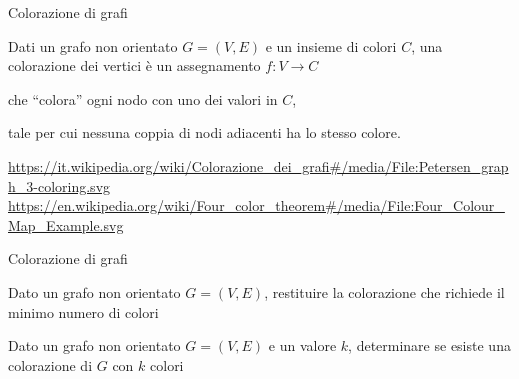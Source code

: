 \begin{frame}{Colorazione di grafi}

\vspace{-9pt}
\begin{myboxtitle}
Dati un grafo non orientato $G=(V,E)$ e un insieme di colori $C$, una \alert{colorazione} dei vertici è un assegnamento  $f: V \rightarrow C$
\BI
\item che ``colora'' ogni nodo con uno dei valori in $C$, 
\item tale per cui nessuna coppia di nodi adiacenti ha lo stesso colore.
\EI
\end{myboxtitle}

\vspace{-12pt}
\tiny
\url{https://it.wikipedia.org/wiki/Colorazione_dei_grafi\#/media/File:Petersen_graph_3-coloring.svg}
\url{https://en.wikipedia.org/wiki/Four_color_theorem\#/media/File:Four_Colour_Map_Example.svg}
\end{frame}

\begin{frame}{Colorazione di grafi}

\vspace{-9pt}
\begin{myboxtitle}
Dato un grafo non orientato $G=(V,E)$, restituire la colorazione che richiede il minimo numero di colori
\end{myboxtitle}

\begin{myboxtitle}
Dato un grafo non orientato $G=(V,E)$ e un valore $k$, determinare se esiste
una colorazione di $G$ con $k$ colori
\end{myboxtitle}

\end{frame}

